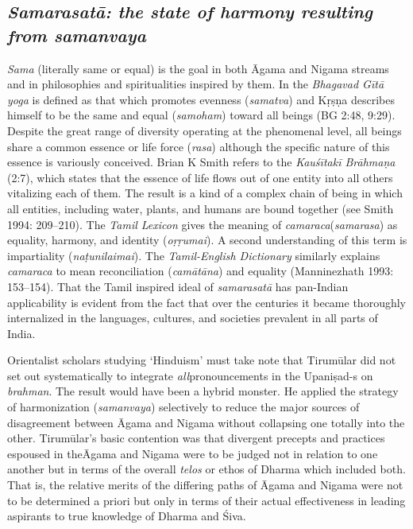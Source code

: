\subsection*{\textit{Samarasatā: the state of harmony resulting from samanvaya}}

\textit{Sama} (literally same or equal) is the goal in both Āgama and Nigama streams and in philosophies and spiritualities inspired by them. In the \textit{Bhagavad Gītā yoga} is defined as that which promotes evenness (\textit{samatva}) and Kṛṣṇa describes himself to be the same and equal (\textit{samoham}) toward all beings (BG 2:48, 9:29). Despite the great range of diversity operating at the phenomenal level, all beings share a common essence or life force (\textit{rasa}) although the specific nature of this essence is variously conceived. Brian K Smith refers to the \textit{Kauśītakī Brāhmaṇa} (2:7), which states that the essence of life flows out of one entity into all others vitalizing each of them. The result is a kind of a complex chain of being in which all entities, including water, plants, and humans are bound together (see Smith 1994: 209–210). The \textit{Tamil Lexicon} gives the meaning of \textit{camaraca}(\textit{samarasa}) as equality, harmony, and identity (\textit{oṛṛumai}). A second understanding of this term is impartiality (\textit{naṭunilaimai}). The \textit{Tamil-English Dictionary} similarly explains \textit{camaraca} to mean reconciliation (\textit{camātāna}) and equality (Manninezhath 1993: 153–154). That the Tamil inspired ideal of \textit{samarasatā} has pan-Indian applicability is evident from the fact that over the centuries it became thoroughly internalized in the languages, cultures, and societies prevalent in all parts of India.

Orientalist scholars studying ‘Hinduism’ must take note that Tirumūlar did not set out systematically to integrate \textit{all}pronouncements in the Upaniṣad-s on \textit{brahman}. The result would have been a hybrid monster. He applied the strategy of harmonization (\textit{samanvaya}) selectively to reduce the major sources of disagreement between Āgama and Nigama without collapsing one totally into the other. Tirumūlar’s basic contention was that divergent precepts and practices espoused in the\break Āgama and Nigama were to be judged not in relation to one another but in terms of the overall \textit{telos} or ethos of Dharma which included both. That is, the relative merits of the differing paths of Āgama and Nigama were not to be determined a priori but only in terms of their actual effectiveness in leading aspirants to true knowledge of Dharma and Śiva.


